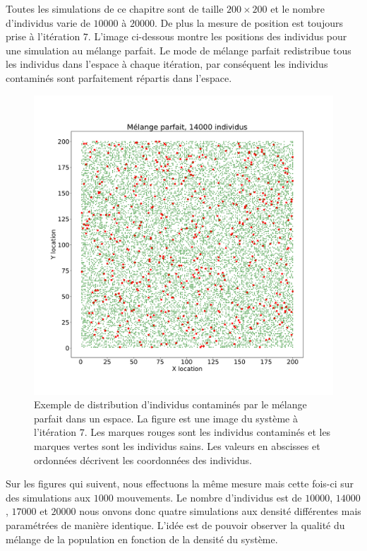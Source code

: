 Toutes les simulations de ce chapitre sont de taille $200 \times 200$ et le nombre d'individus varie de $10000$ à $20000$. De plus la mesure de position est toujours prise à l'itération $7$. L'image ci-dessous montre les positions des individus pour une simulation au mélange parfait. Le mode de mélange parfait redistribue tous les individus dans l'espace à chaque itération, par conséquent les individus contaminés sont parfaitement répartis dans l'espace.

\begin{figure}[h]
	\centering
	\captionsetup{justification=centering}
	\includegraphics[width=.7\textwidth]{Images/SI_positions_14k_mix.pdf}
	\caption[Positions des individus : mélange parfait]{Exemple de distribution d'individus contaminés par le mélange parfait dans un espace. La figure est une image du système à l'itération $7$. Les marques rouges sont les individus contaminés et les marques vertes sont les individus sains. Les valeurs en abscisses et ordonnées décrivent les coordonnées des individus.}
\end{figure}

\newpage

Sur les figures qui suivent, nous effectuons la même mesure mais cette fois-ci sur des simulations aux $1000$ mouvements. Le nombre d'individus est de $10000$, $14000$, $17000$ et $20000$ nous onvons donc quatre simulations aux densité différentes mais paramétrées de manière identique. L'idée est de pouvoir observer la qualité du mélange de la population en fonction de la densité du système.

